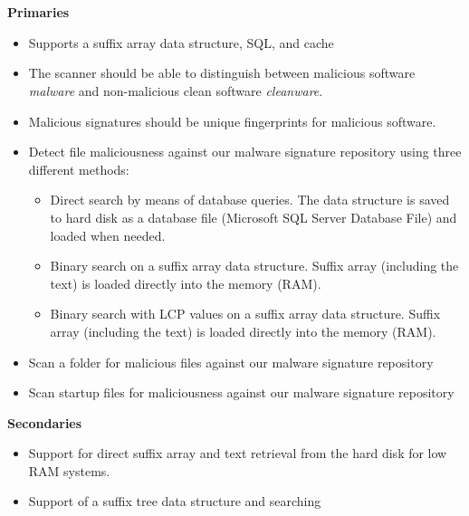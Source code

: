 \documentclass[12pt]{article} %
\begin{document}
\\ \\
\textbf{Primaries} 
\begin{itemize}
  \item Supports a suffix array data structure, SQL, and cache
  \item The scanner should be able to distinguish between malicious software \emph{malware} and non-malicious clean software \emph{cleanware}.
  \item Malicious signatures should be unique fingerprints for malicious software.
  \item Detect file maliciousness against our malware signature repository using three different methods:
  	\begin{itemize}
  	\item Direct search by means of database queries. The data structure is saved to hard disk as a database file (Microsoft SQL Server Database File) and loaded when needed.
  	\item Binary search on a suffix array data structure. Suffix array (including the text) is loaded directly into the memory (RAM). 
  	\item Binary search with LCP values on a suffix array data structure. Suffix array (including the text) is loaded directly into the memory (RAM). 
	\end{itemize} 
  \item Scan a folder for malicious files against our malware signature repository 
  \item Scan startup files for maliciousness against our malware signature repository
\end{itemize}
\textbf{Secondaries} 
\begin{itemize}
  \item Support for direct suffix array and text retrieval from the hard disk for low RAM systems.
  \item Support of a suffix tree data structure and searching
\end{itemize}
\end{document}
